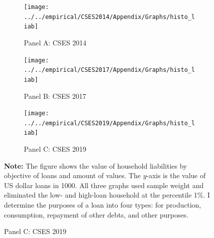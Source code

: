\documentclass[11pt,letterpaper]{article}
\begin{document}

\begin{figure}[H]
	\caption{The value of loans and their objectives}
	\label{fig:7}
	\begin{subfigure}[b]{0.33\linewidth}
		\caption*{Panel A: CSES 2014} \vspace{-.5em}
		\label{fig:3a}
		\texttt{[image: ../../empirical/CSES2014/Appendix/Graphs/histo\_liab]} 
	\end{subfigure}%
	\hfil
	\begin{subfigure}[b]{0.33\linewidth}
		\caption*{Panel B: CSES 2017} \vspace{-.5em}
		\label{fig:3b}
		\texttt{[image: ../../empirical/CSES2017/Appendix/Graphs/histo\_liab]} 
	\end{subfigure}
	\hfil
	\begin{subfigure}[b]{0.33\linewidth}
		\caption*{Panel C: CSES 2019} \vspace{-.5em}
		\label{fig:3c}
		\texttt{[image: ../../empirical/CSES2019/Appendix/Graphs/histo\_liab]} 
	\end{subfigure}
	\begin{tablenotes}
		\footnotesize
		\item \textbf{Note:} The figure shows the value of household liabilities by objective of loans and amount of values. The $y$-axis is the value of US dollar loans in 1000. All three graphs used sample weight and eliminated the low- and high-loan household at the percentile 1\%. I determine the purposes of a loan into four types: for production, consumption, repayment of other debts, and other purposes.    
	\end{tablenotes} 
	
\end{figure}













%	
\end{document}
